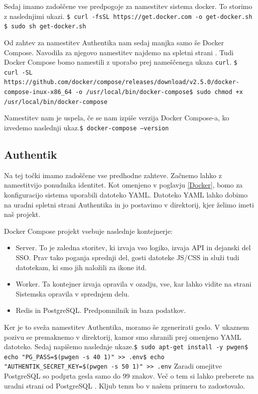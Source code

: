 \documentclass[a4paper,12pt,openright,oneside]{book}
\begin{document}
Sedaj imamo zadoščene vse predpogoje za namestitev sistema docker. To storimo z naslednjimi ukazi.\newline
\texttt{\$  curl -fsSL https://get.docker.com -o get-docker.sh}\newline
\texttt{\$  sudo sh get-docker.sh}


Od zahtev za namestitev Authentika nam sedaj manjka samo še Docker Compose. Navodila za njegovo namestitev najdemo na spletni strani \cite{DockerCompose}. 
Tudi Docker Compose bomo namestili z uporabo prej nameščenega ukaza \texttt{curl}.\newline
\texttt{\$ curl -SL https://github.com/docker/compose/releases/download/v2.5.0\newline/docker-compose-inux-x86\_64 -o /usr/local/bin/docker-compose}\newline\texttt{\$  sudo chmod +x /usr/local/bin/docker-compose}

Namestitev nam je uspela, če se nam izpiše verzija Docker Compose-a, ko izvedemo naslednji ukaz.\newline\texttt{\$ docker-compose --version}  
\subsection{Authentik}
Na tej točki imamo zadoščene vse predhodne zahteve. Začnemo lahko z namestitvijo ponudnika identitet. Kot omenjeno v poglavju \ref{Docker}, bomo za konfiguracijo sistema uporabili datoteko YAML. Datoteko YAML lahko dobimo na uradni spletni strani Authentika \cite{AuthentikYAML} in jo postavimo v direktorij, kjer želimo imeti naš projekt. 

Docker Compose projekt vsebuje naslednje kontejnerje:

\begin{itemize}
    \item Server. To je zaledna storitev, ki izvaja vso logiko, izvaja API in dejanski del SSO. Prav tako poganja sprednji del, gosti datoteke JS/CSS in služi tudi datotekam, ki smo jih naložili za ikone itd.
    \item Worker. Ta kontejner izvaja opravila v ozadju, vse, kar lahko vidite na strani Sistemska opravila v sprednjem delu.
    \item Redis in PostgreSQL. Predpomnilnik in baza podatkov.
\end{itemize}
Ker je to sveža namestitev Authentika, moramo še zgenerirati geslo. V ukaznem pozivu se premaknemo v direktorij, kamor smo shranili prej omenjeno YAML datoteko. Sedaj napišemo naslednje ukaze.\newline\texttt{\$  sudo apt-get install -y pwgen}\newline\texttt{\$ echo "PG\_PASS=\$(pwgen -s 40 1)" >> .env}\newline\texttt{\$ echo "AUTHENTIK\_SECRET\_KEY=\$(pwgen -s 50 1)" >> .env}
Zaradi omejitve PostgreSQL so podprta gesla samo do 99 znakov. Več o tem si lahko preberete na uradni strani od PostgreSQL \cite{PostgreSQL}. Kljub temu bo v našem primeru to zadostovalo. \newline
\end{document}
